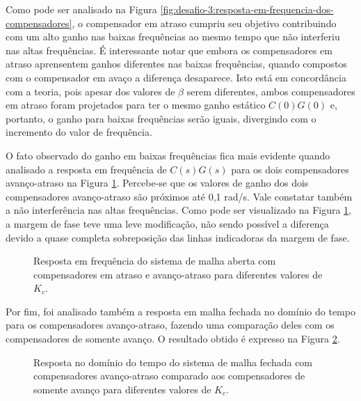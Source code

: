 Como pode ser analisado na Figura
\ref{fig:desafio-3:resposta-em-frequencia-dos-compensadores}, o compensador em
atraso cumpriu seu objetivo contribuindo com um alto ganho nas baixas frequências
ao mesmo tempo que não interferiu nas altas frequências. É interessante notar
que embora os compensadores em atraso aprensentem ganhos diferentes nas baixas
frequências, quando compostos com o compensador em avaço a diferença desaparece.
Isto está em concordância com a teoria, pois apesar dos valores de $\beta$
serem diferentes, ambos compensadores em atraso foram projetados para ter o
mesmo ganho estático $C(0)G(0)$ e, portanto, o ganho para baixas frequências
serão iguais, divergindo com o incremento do valor de frequência.

O fato observado do ganho em baixas frequências fica mais evidente quando
analisado a resposta em frequência de $C(s)G(s)$ para os dois compensadores
avanço-atraso na Figura
\ref{fig:desafio-3:resposta-em-frequencia-da-malha-aberta}. Percebe-se que os
valores de ganho dos dois compensadores avanço-atraso são próximos até 0,1
rad/s. Vale constatar também a não interferência nas altas frequências. Como
pode ser visualizado na Figura
\ref{fig:desafio-3:resposta-em-frequencia-da-malha-aberta}, a margem de fase teve
uma leve modificação, não sendo possível a diferença devido a quase completa
sobreposição das linhas indicadoras da margem de fase.

\begin{figure}[H]
    \caption{Resposta em frequência do sistema de malha aberta com compensadores
    em atraso e avanço-atraso para diferentes valores de $K_c$.}
    \vspace{-10pt}
    \hspace{-30pt}
    \label{fig:desafio-3:resposta-em-frequencia-da-malha-aberta}
    \begin{minipage}{\linewidth}
        
    \end{minipage}
\end{figure}

Por fim, foi analisado também a resposta em malha fechada no domínio do tempo
para os compensadores avanço-atraso, fazendo uma comparação deles com os
compensadores de somente avanço. O resultado obtido é expresso na Figura
\ref{fig:desafio-3:resposta-dominio-do-tempo-dos-compensadores-avanco-atraso}.

\begin{figure}[H]
    \caption{Resposta no domínio do tempo do sistema de malha fechada com
    compensadores avanço-atraso comparado aos compensadores de somente avanço
    para diferentes valores de $K_c$.}
    \vspace{-10pt}
    \hspace{-30pt}
    \label{fig:desafio-3:resposta-dominio-do-tempo-dos-compensadores-avanco-atraso}
    \begin{minipage}{\linewidth}
        
    \end{minipage}
\end{figure}

